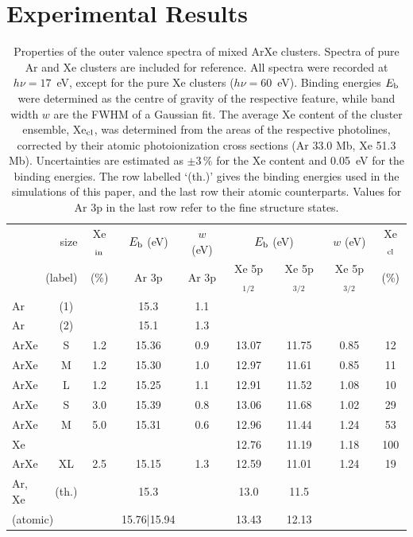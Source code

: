 \section{Experimental Results}
\label{sec:exp_results}
%
%
\begin{table}
\caption{Properties of the outer valence spectra of mixed ArXe clusters. 
Spectra of pure Ar and Xe clusters are included for reference. 
All spectra were recorded at $h\nu = 17$~eV, except for the pure Xe clusters ($h\nu = 60$~eV). 
Binding energies $E_{\rm b}$ were determined as the centre of gravity of the respective feature, while band width $w$ are the FWHM of a Gaussian fit. 
The average Xe content of the cluster ensemble, Xe$_{\rm cl}$, was determined from the areas of the respective photolines, corrected by their atomic photoionization cross sections (Ar 33.0 Mb, Xe 51.3 Mb)\cite{samson2002}.
Uncertainties are estimated as $\pm$3\,\% for the Xe content and 0.05~eV for the binding energies. 
The row labelled `(th.)' gives the binding energies used in the simulations of this paper, and the last row their atomic counterparts. 
Values for Ar 3p in the last row refer to the fine structure states.
\label{tab:valence}}
\begin{tabular}{ l c c c c c c c c}
%
\toprule
 \multicolumn{2}{r}{size} &  Xe$_{\rm in}$& $E_{\rm b}$ (eV)& $w$ (eV)& \multicolumn{2}{c}{$E_{\rm b}$ (eV)}  & $w$ (eV) &  Xe$_{\rm cl}$ \\
%
 \multicolumn{2}{r}{(label)}&  (\%) & Ar 3p & Ar 3p & Xe 5p$_{1/2}$ &  Xe 5p$_{3/2}$ & Xe 5p$_{3/2}$  &  (\%) \\
\midrule
 Ar & (1) &&  15.3  &  1.1 & & & &  \\
 Ar & (2) &&  15.1  &  1.3 & & & &  \\
%
 ArXe & S &1.2 & 15.36 & 0.9 & 13.07 & 11.75 & 0.85 & 12\\
 ArXe & M &1.2 & 15.30 & 1.0 & 12.97 & 11.61 & 0.85 & 11\\
 ArXe & L &1.2 & 15.25 & 1.1 & 12.91 & 11.52 & 1.08 & 10\\
 ArXe & S &3.0 & 15.39 & 0.8 & 13.06 & 11.68 & 1.02 & 29\\
 ArXe & M &5.0 & 15.31 & 0.6 & 12.96 & 11.44 & 1.24 & 53\\
 Xe &  & & & & 12.76 & 11.19 & 1.18 & 100\\
%
\midrule
%
 ArXe & XL &2.5 & 15.15 & 1.3 & 12.59 & 11.01 & 1.24 & 19\\
%
\midrule
 Ar, Xe & (th.) && 15.3 && 13.0 & 11.5 &&\\
%
 \multicolumn{2}{l}{(atomic)\cite{velchev,sansonetti}} && 15.76|15.94 && 13.43 & 12.13 &&\\
%
\bottomrule
\end{tabular}
\end{table}

